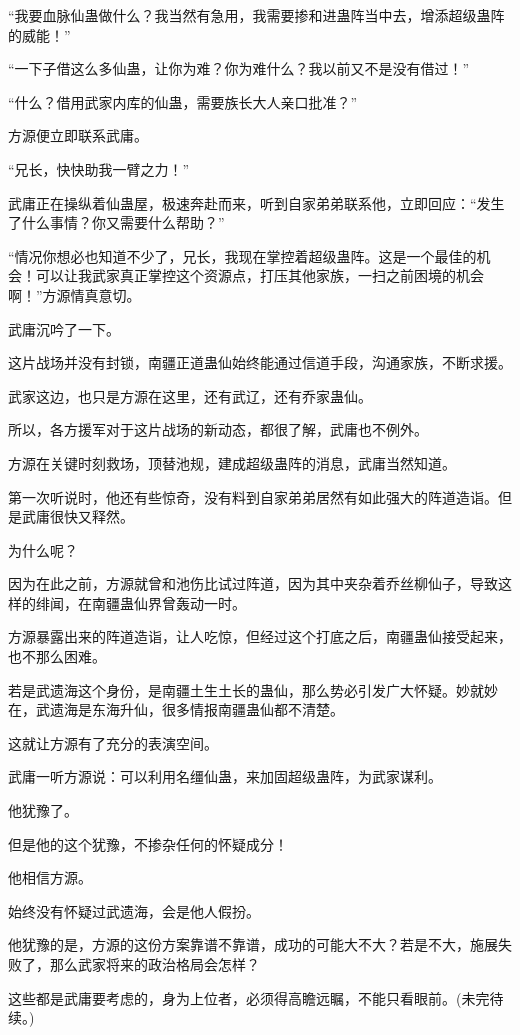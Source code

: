\begin{this_body}
“我要血脉仙蛊做什么？我当然有急用，我需要掺和进蛊阵当中去，增添超级蛊阵的威能！”

“一下子借这么多仙蛊，让你为难？你为难什么？我以前又不是没有借过！”

“什么？借用武家内库的仙蛊，需要族长大人亲口批准？”

方源便立即联系武庸。

“兄长，快快助我一臂之力！”

武庸正在操纵着仙蛊屋，极速奔赴而来，听到自家弟弟联系他，立即回应：“发生了什么事情？你又需要什么帮助？”

“情况你想必也知道不少了，兄长，我现在掌控着超级蛊阵。这是一个最佳的机会！可以让我武家真正掌控这个资源点，打压其他家族，一扫之前困境的机会啊！”方源情真意切。

武庸沉吟了一下。

这片战场并没有封锁，南疆正道蛊仙始终能通过信道手段，沟通家族，不断求援。

武家这边，也只是方源在这里，还有武辽，还有乔家蛊仙。

所以，各方援军对于这片战场的新动态，都很了解，武庸也不例外。

方源在关键时刻救场，顶替池规，建成超级蛊阵的消息，武庸当然知道。

第一次听说时，他还有些惊奇，没有料到自家弟弟居然有如此强大的阵道造诣。但是武庸很快又释然。

为什么呢？

因为在此之前，方源就曾和池伤比试过阵道，因为其中夹杂着乔丝柳仙子，导致这样的绯闻，在南疆蛊仙界曾轰动一时。

方源暴露出来的阵道造诣，让人吃惊，但经过这个打底之后，南疆蛊仙接受起来，也不那么困难。

若是武遗海这个身份，是南疆土生土长的蛊仙，那么势必引发广大怀疑。妙就妙在，武遗海是东海升仙，很多情报南疆蛊仙都不清楚。

这就让方源有了充分的表演空间。

武庸一听方源说：可以利用名缰仙蛊，来加固超级蛊阵，为武家谋利。

他犹豫了。

但是他的这个犹豫，不掺杂任何的怀疑成分！

他相信方源。

始终没有怀疑过武遗海，会是他人假扮。

他犹豫的是，方源的这份方案靠谱不靠谱，成功的可能大不大？若是不大，施展失败了，那么武家将来的政治格局会怎样？

这些都是武庸要考虑的，身为上位者，必须得高瞻远瞩，不能只看眼前。(未完待续。)

\end{this_body}

